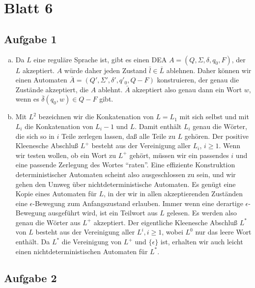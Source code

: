 \section*{Blatt 6}
%

\subsection*{Aufgabe 1}

\begin{enumerate}[a)]
  \item Da $L$ eine reguläre Sprache ist, gibt es einen DEA $A = (Q, \Sigma, \delta, q_0, F)$, der $L$ akzeptiert. $A$ würde daher jeden Zustand $\bar{l} \in \bar{L}$ ablehnen. Daher können wir einen Automaten $\bar{A} = (Q', \Sigma', \delta', q'_0, Q-F)$ konstruieren, der genau die Zustände akzeptiert, die $A$ ablehnt. $\bar{A}$ akzeptiert also genau dann ein Wort $w$, wenn es $\bar{\delta}(q_0, w) \in Q-F$ gibt.

  \item Mit $L^2$ bezeichnen wir die Konkatenation von
   $L = L_1$ mit sich selbst und mit $L_i$ die Konkatenation
   von $L_i-1$ und $L$. Damit enthält $L_i$ genau die Wörter,
    die sich so in $i$ Teile zerlegen lassen, daß alle Teile
    zu $L$ gehören. Der positive Kleenesche Abschluß $L^{+}$
    besteht aus der Vereinigung aller $L_i$, $i \geq 1$. Wenn
     wir testen wollen, ob ein Wort zu $L^{+}$ gehört, müssen
     wir ein passendes $i$ und eine passende Zerlegung des Wortes
      ``raten''. Eine effiziente Konstruktion deterministischer
      Automaten scheint also ausgeschlossen zu sein, und wir gehen
       den Umweg über nichtdeterministische Automaten. Es genügt
       eine Kopie eines Automaten für $L$, in der wir in allen
       akzeptierenden Zuständen eine $\epsilon$-Bewegung zum Anfangszustand
        erlauben. Immer wenn eine derartige $\epsilon$-Bewegung
        ausgeführt wird, ist ein Teilwort aus $L$ gelesen. Es werden
        also genau die Wörter aus $L^{+}$ akzeptiert. Der eigentliche
         Kleenesche Abschluß $L^{*}$ von $L$ besteht aus der Vereinigung
         aller $L^{i}, i \geq 1$, wobei $L^{0}$ nur das leere Wort enthält.
         Da $L^{*}$ die Vereinigung von $L^{+}$
 und $\{\epsilon\}$ ist, erhalten wir auch leicht einen nichtdeterministischen
 Automaten für $L^{*}$.
\end{enumerate}

\subsection*{Aufgabe 2}


